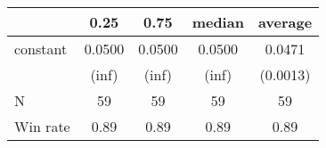 \begin{tabular}{lcccc}
\hline
         &  0.25  &  0.75  & median & average   \\
\midrule
\midrule
constant & 0.0500 & 0.0500 & 0.0500 & 0.0471    \\
         & (inf)  & (inf)  & (inf)  & (0.0013)  \\
N        & 59     & 59     & 59     & 59        \\
Win rate & 0.89   & 0.89   & 0.89   & 0.89      \\
\hline
\end{tabular}